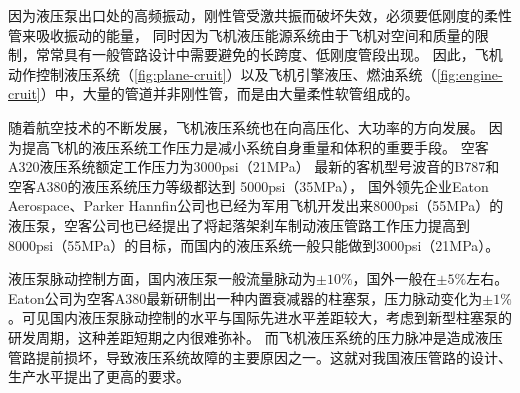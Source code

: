因为液压泵出口处的高频振动，刚性管受激共振而破坏失效，必须要低刚度的柔性管来吸收振动的能量，
同时因为飞机液压能源系统由于飞机对空间和质量的限制，常常具有一般管路设计中需要避免的长跨度、低刚度管段出现\cite{gaofeng2013}。
因此，飞机动作控制液压系统（\ref{fig:plane-cruit}）以及飞机引擎液压、燃油系统（\ref{fig:engine-cruit}）中，大量的管道并非刚性管，而是由大量柔性软管组成的。


随着航空技术的不断发展，飞机液压系统也在向高压化、大功率的方向发展。
因为提高飞机的液压系统工作压力是减小系统自身重量和体积的重要手段。
空客A320液压系统额定工作压力为3000psi（21MPa）
最新的客机型号波音的B787和空客A380的液压系统压力等级都达到 5000psi（35MPa）\cite{lavooij1991}，
国外领先企业Eaton Aerospace、Parker Hannfin公司也已经为军用飞机开发出来8000psi（55MPa）的液压泵，空客公司也已经提出了将起落架刹车制动液压管路工作压力提高到8000psi（55MPa）的目标，而国内的液压系统一般只能做到3000psi（21MPa）。


\begin{figure}
	\centering
	\hspace{1cm}
	\label{fig:hose fail}
\end{figure}





液压泵脉动控制方面，国内液压泵一般流量脉动为$\pm10\%$，国外一般在$ \pm5\% $左右\cite{lijun2007}。Eaton公司为空客A380最新研制出一种内置衰减器的柱塞泵，压力脉动变化为$ \pm 1\%$。可见国内液压泵脉动控制的水平与国际先进水平差距较大，考虑到新型柱塞泵的研发周期，这种差距短期之内很难弥补。
而飞机液压系统的压力脉冲是造成液压管路提前损坏，导致液压系统故障的主要原因之一。这就对我国液压管路的设计、生产水平提出了更高的要求。





